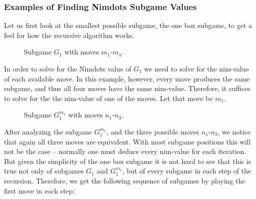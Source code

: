 \documentclass[12pt,twoside]{reedthesis}
\begin{document}
\subsubsection{Examples of Finding Nimdots Subgame Values}

\underline{}

\noindent
Let us first look at the smallest possible subgame, the one box subgame, to get a feel for how the recursive algorithm works.

\begin{figure}[H]
\centering
{}
\caption{Subgame $G_1$ with moves $m_1$-$m_4$.}
\end{figure}

\noindent
In order to solve for the Nimdots value of $G_1$ we need to solve for the nim-value of each available move.  In this example, however, every move produces the same subgame, and thus all four moves have the same nim-value.  Therefore, it suffices to solve for the the nim-value of one of the moves.  Let that move be $m_1$.

\begin{figure}[H]
\centering
{}
\caption{Subgame $G^{m_1}_1$ with moves $n_1$-$n_3$.}
\end{figure}

\noindent
After analyzing the subgame $G^{m_1}_1$, and the three possible moves $n_1$-$n_3$, we notice that again all three moves are equivalent.  With most subgame positions this will not be the case -- normally one must deduce every nim-value for each iteration.  But given the simplicity of the one box subgame it is not hard to see that this is true not only of subgames  $G_1$ and  $G^{m_1}_1$, but of every subgame in each step of the recursion.  Therefore, we get the following sequence of subgames by playing the first move in each step:
\end{document}
